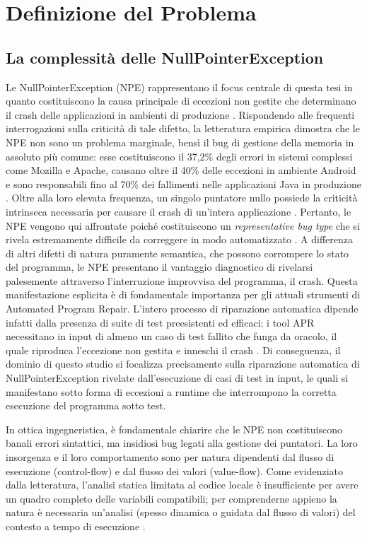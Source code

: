 \section{Definizione del Problema}

\subsection{La complessità delle NullPointerException }
Le NullPointerException (NPE) rappresentano il focus centrale di questa tesi in quanto
 costituiscono la causa principale di eccezioni non gestite che determinano il crash 
 delle applicazioni in ambienti di produzione \cite{durieux2017dynamic}. Rispondendo alle frequenti interrogazioni 
 sulla criticità di tale difetto, la letteratura empirica dimostra che le NPE non sono un 
 problema marginale, bensì il bug di gestione della memoria in assoluto più comune: esse 
 costituiscono il 37,2\% degli errori in sistemi complessi come Mozilla e Apache, causano 
 oltre il 40\% delle eccezioni in ambiente Android e sono responsabili fino al 70\% dei 
 fallimenti nelle applicazioni Java in produzione \cite{durieux2017dynamic,xu2019vfix}. Oltre alla loro elevata frequenza, 
 un singolo puntatore nullo possiede la criticità intrinseca necessaria per causare il 
 crash di un'intera applicazione \cite{durieux2017dynamic}. Pertanto, le NPE vengono qui affrontate poiché costituiscono
  un \textit{representative bug type} che si rivela estremamente difficile 
  da correggere in modo automatizzato \cite{xu2019vfix}. A differenza di altri difetti di natura puramente semantica,
  che possono corrompere lo stato del programma, le NPE presentano il vantaggio 
  diagnostico di rivelarsi palesemente attraverso l'interruzione improvvisa del programma, il crash.
   Questa manifestazione esplicita è di fondamentale importanza per gli attuali strumenti di Automated 
Program Repair. L'intero processo di riparazione automatica dipende infatti dalla presenza di suite 
di test preesistenti ed efficaci: i tool APR necessitano in input di almeno un 
caso di test fallito che funga da oracolo, il quale riproduca l'eccezione non gestita e inneschi il crash \cite{durieux2017dynamic,xu2019vfix}. 
Di conseguenza, il dominio di questo studio si focalizza precisamente sulla riparazione automatica di 
NullPointerException rivelate dall'esecuzione di casi di test in input, le quali si manifestano 
sotto forma di eccezioni a runtime che interrompono la corretta esecuzione del programma sotto test.

In ottica ingegneristica, è fondamentale chiarire che le NPE non costituiscono banali errori sintattici, 
ma insidiosi bug legati alla gestione dei puntatori. La loro insorgenza e il loro comportamento sono per 
natura dipendenti dal flusso di esecuzione (control-flow) e dal flusso dei valori (value-flow). 
Come evidenziato dalla letteratura, l'analisi statica limitata al codice locale è insufficiente 
per avere un quadro completo delle variabili compatibili; per comprenderne appieno la natura è 
necessaria un'analisi (spesso dinamica o guidata dal flusso di valori) del contesto a tempo di esecuzione \cite{durieux2017dynamic,xu2019vfix}.


